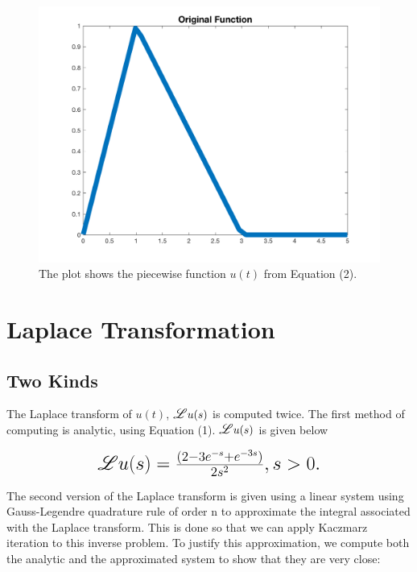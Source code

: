 \documentclass{article}
\newcommand\Laplace{\mathlarger{\mathlarger{\mathscr{L}}}}
\begin{document}
\begin{figure}[H]
    \centerline{
    \includegraphics[height = 10 cm]{Piecewise.png}
    }
    \caption{\label{fig:Piecewise}The plot shows the piecewise function $u(t)$ from Equation (2).}

\end{figure}

\section{Laplace Transformation}

\subsection{Two Kinds}

The Laplace transform of $u(t)$, $\Laplace{u(s)}$ is computed twice. The first method of computing is analytic, using Equation (1). $\Laplace{u(s)}$ is given below

\begin{equation}
\mbox{\fontsize{17}{21.6}\(
\mathscr{L} u(s) = \frac{(2 - 3e^{-s} + e^{-3s})}{2s^{2}},   s > 0.
\)}
\end{equation}


The second version of the Laplace transform is given using a linear system using Gauss-Legendre quadrature rule of order n to approximate the integral associated with the Laplace transform. This is done so that we can apply Kaczmarz iteration to this inverse problem. To justify this approximation, we compute both the analytic and the approximated system to show that they are very close:
\end{document}
